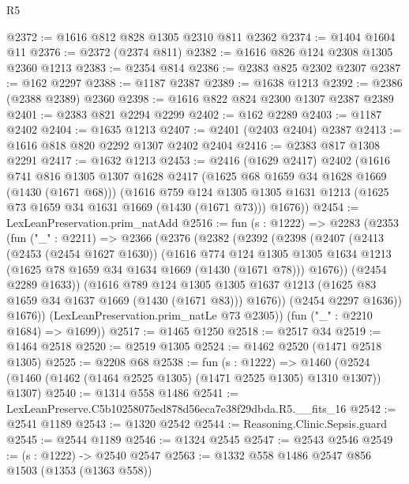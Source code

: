\begin{lexlean}{R5}
\begin{coremodule}
@2372 := @1616 @812 @828 @1305 @2310 @811 @2362
@2374 := @1404 @1604 @11
@2376 := @2372 (@2374 @811)
@2382 := @1616 @826 @124 @2308 @1305 @2360 @1213
@2383 := @2354 @814
@2386 := @2383 @825 @2302 @2307
@2387 := @162 @2297
@2388 := @1187 @2387
@2389 := @1638 @1213
@2392 := @2386 (@2388 @2389) @2360
@2398 := @1616 @822 @824 @2300 @1307 @2387 @2389
@2401 := @2383 @821 @2294 @2299
@2402 := @162 @2289
@2403 := @1187 @2402
@2404 := @1635 @1213
@2407 := @2401 (@2403 @2404) @2387
@2413 := @1616 @818 @820 @2292 @1307 @2402 @2404
@2416 := @2383 @817 @1308 @2291
@2417 := @1632 @1213
@2453 := @2416
    (@1629 @2417)
    @2402
    (@1616
      @741
      @816
      @1305
      @1307
      @1628
      @2417
      (@1625 @68 @1659 @34 @1628 @1669 (@1430 (@1671 @68)))
      (@1616
        @759
        @124
        @1305
        @1305
        @1631
        @1213
        (@1625 @73 @1659 @34 @1631 @1669 (@1430 (@1671 @73)))
        @1676))
@2454 := LexLeanPreservation.prim_natAdd
@2516 := fun (s : @1222) =>
  @2283
    (@2353
      (fun ("_" : @2211) =>
      @2366
        (@2376
          (@2382
            (@2392
              (@2398
                (@2407
                  (@2413
                    (@2453 (@2454 @1627 @1630))
                    (@1616
                      @774
                      @124
                      @1305
                      @1305
                      @1634
                      @1213
                      (@1625 @78 @1659 @34 @1634 @1669 (@1430 (@1671 @78)))
                      @1676))
                  (@2454 @2289 @1633))
                (@1616
                  @789
                  @124
                  @1305
                  @1305
                  @1637
                  @1213
                  (@1625 @83 @1659 @34 @1637 @1669 (@1430 (@1671 @83)))
                  @1676))
              (@2454 @2297 @1636))
            @1676))
        (LexLeanPreservation.prim_natLe @73 @2305))
      (fun ("_" : @2210 @1684) => @1699))
@2517 := @1465 @1250
@2518 := @2517 @34
@2519 := @1464 @2518
@2520 := @2519 @1305
@2524 := @1462 @2520 (@1471 @2518 @1305)
@2525 := @2208 @68
@2538 := fun (s : @1222) =>
  @1460 (@2524 (@1460 (@1462 (@1464 @2525 @1305) (@1471 @2525 @1305) @1310 @1307)) @1307)
@2540 := @1314 @558 @1486
@2541 := LexLeanPreserve.C5b10258075ed878d56eca7e38f29dbda.R5.__fits_16
@2542 := @2541 @1189
@2543 := @1320 @2542
@2544 := Reasoning.Clinic.Sepsis.guard
@2545 := @2544 @1189
@2546 := @1324 @2545
@2547 := @2543 @2546
@2549 := (s : @1222) -> @2540 @2547
@2563 := @1332
    @558
    @1486
    @2547
    @856
    @1503
    (@1353 (@1363 @558))

\end{coremodule}
\end{lexlean}
